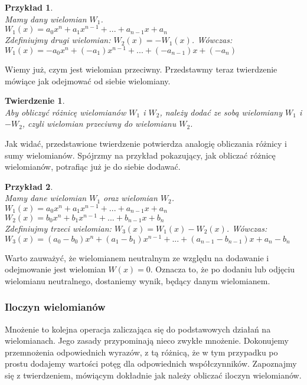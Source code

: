\documentclass[oneside,a4paper]{book}
\newtheorem{theorem}{Twierdzenie}
\newtheorem{example}{Przykład}
\begin{document}
	\begin{example}
		$ $\\
		Mamy dany wielomian $W_1$. \\
		$W_1(x) = a_0x^n + a_1x^{n-1} + ... + a_{n-1}x + a_n$ \\
		Zdefiniujmy drugi wielomian: $W_2(x) = -W_1(x)$. Wówczas: \\
		$W_1(x) = -a_0x^n + (-a_1)x^{n-1} + ... + (-a_{n-1})x + (-a_n)$
	\end{example}
	
	Wiemy już, czym jest wielomian przeciwny. Przedstawmy teraz twierdzenie mówiące jak odejmować od siebie wielomiany.
	
	\begin{theorem}
		$ $\\
		Aby obliczyć różnicę wielomianów $W_1$ i $W_2$, należy dodać ze sobą wielomiany $W_1$ i $-W_2$, czyli wielomian przeciwny do wielomianu $W_2$.
	\end{theorem}
	
	Jak widać, przedstawione twierdzenie potwierdza analogię obliczania różnicy i sumy wielomianów. Spójrzmy na przykład pokazujący, jak obliczać różnicę wielomianów, potrafiąc już je do siebie dodawać.
	
	\begin{example}
		$ $\\
		Mamy dane wielomian $W_1$ oraz wielomian $W_2$.
		$W_1(x) = a_0x^n + a_1x^{n-1} + ... + a_{n-1}x + a_n$ \\
		$W_2(x) = b_0x^n + b_1x^{n-1} + ... + b_{n-1}x + b_n$ \\
		Zdefiniujmy trzeci wielomian: $W_3(x) = W_1(x) - W_2(x)$. Wówczas: \\
		$W_3(x) = (a_0-b_0)x^n + (a_1-b_1)x^{n-1} + ... + (a_{n-1} - b_{n-1})x + a_n - b_n$
	\end{example}
	
	Warto zauważyć, że wielomianem neutralnym ze względu na dodawanie i odejmowanie jest wielomian $W(x)=0$. Oznacza to, że po dodaniu lub odjęciu wielomianu neutralnego, dostaniemy wynik, będący danym wielomianem.
	
	\subsubsection{Iloczyn wielomianów}
	
	Mnożenie to kolejna operacja zaliczająca się do podstawowych działań na wielomianach. Jego zasady przypominają nieco zwykłe mnożenie. Dokonujemy przemnożenia odpowiednich wyrazów, z tą różnicą, że w tym przypadku po prostu dodajemy wartości potęg dla odpowiednich współczynników. Zapoznajmy się z twierdzeniem, mówiącym dokładnie jak należy obliczać iloczyn wielomianów.
	
\end{document}
